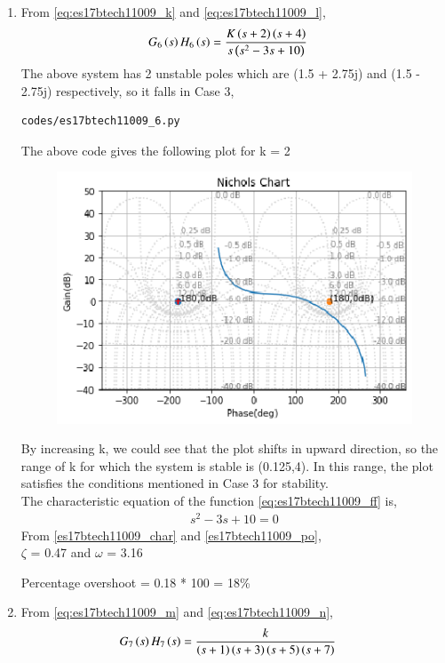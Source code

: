 \begin{enumerate}[label=\thesection.\arabic*.,ref=\thesection.\theenumi]
\item
From \eqref{eq:es17btech11009_k} and \eqref{eq:es17btech11009_l},
\begin{align}
G_6\brak{s}H_6\brak{s}&= \frac{K\brak{s+2}\brak{s+4}}{s\brak{s^2 - 3s +10}}
\label{eq:es17btech11009_ff}
\end{align}
The above system has 2 unstable poles which are (1.5 + 2.75j) and (1.5 - 2.75j) respectively, so it falls in  Case 3, 
\begin{lstlisting}
codes/es17btech11009_6.py
\end{lstlisting}
The above code gives the following plot for k = 2
\begin{figure}[!h]
\centering
\includegraphics[width=\columnwidth]{./figs/es17btech11009_6.eps}
\caption{}
\label{fig:es17btech11009_fig2}
\end{figure}

By increasing k, we could see that the plot shifts in upward direction, so the range of k for which the system is stable is (0.125,4). In this range, the plot satisfies the conditions mentioned in Case 3 for stability.
\\
The characteristic equation of the function \eqref{eq:es17btech11009_ff} is,
\begin{align}
 s^2 - 3s + 10 = 0
 \end{align}
From \eqref{es17btech11009_char} and \eqref{es17btech11009_po},
\\
  $\zeta$ = 0.47 and $\omega$ = 3.16
 
  Percentage overshoot = 0.18 * 100 = 18\%

\item
From \eqref{eq:es17btech11009_m} and \eqref{eq:es17btech11009_n},
\begin{align}
G_7\brak{s}H_7\brak{s}&= \frac{k}{\brak{s+1}\brak{s+3}\brak{s+5}\brak{s+7}}
\label{eq:es17btech11009_gg}
\end{align}


\end{enumerate}
